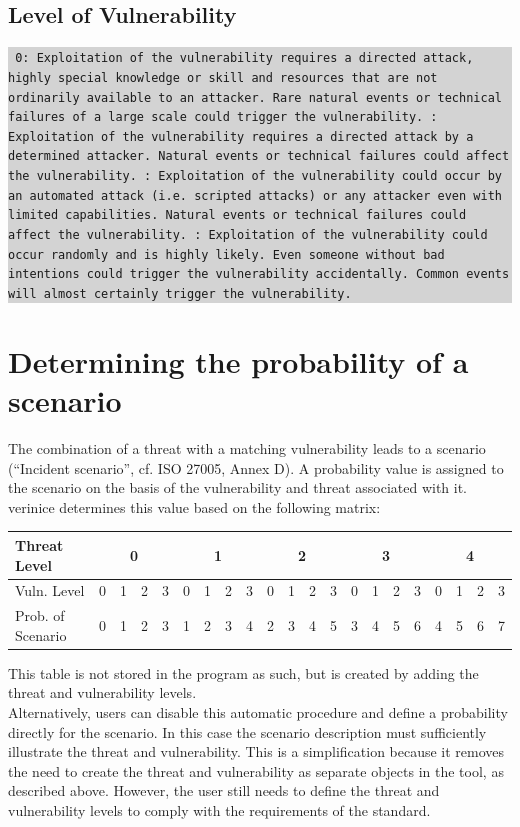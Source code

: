 \documentclass[a4paper,10pt]{book}
\begin{document}
\subsection{Level of Vulnerability}
\colorbox{lightgray}{\parbox{\textwidth}{
{\tt
0: Exploitation of the vulnerability requires a directed attack, highly special
knowledge or skill and resources that are not ordinarily available to an
attacker. Rare natural events or technical failures of a large scale could
trigger the vulnerability.
\newline{}: Exploitation of the vulnerability requires a directed
attack by a determined attacker. Natural events or
technical failures could affect the vulnerability.
\newline{}: Exploitation of the vulnerability could occur by an
automated attack (i.e. scripted attacks) or any attacker
even with limited capabilities. Natural events or technical
failures could affect the vulnerability.
\newline{}: Exploitation of the vulnerability could occur randomly
and is highly likely. Even someone without bad intentions
could trigger the vulnerability accidentally. Common events
will almost certainly trigger the vulnerability.}
}}

\section{Determining the probability of a scenario}
The combination of a threat with a matching vulnerability leads to a scenario
(``Incident scenario'', cf. ISO 27005, Annex D). A probability value is assigned to the
scenario on the basis of the vulnerability and threat associated with it. verinice determines
this value based on the following matrix:
\begin{longtable}{|l||c|c|c|c|c|c|c|c|c|c|c|c|c|c|c|c|c|c|c|c|}
\hline
Threat Level & \multicolumn{4}{c|}{0} & \multicolumn{4}{c|}{1} & \multicolumn{4}{c|}{2} & \multicolumn{4}{c|}{3} & \multicolumn{4}{c|}{4} \\[10pt]
\hline
Vuln. Level & 0 & 1 & 2 & 3 & 0 & 1 & 2 & 3 & 0 & 1 & 2 & 3 & 0 & 1 & 2 & 3 & 0 & 1 & 2 & 3  \\[9pt] \hline
Prob. of Scenario & 0 & 1 & 2 & 3 & 1 & 2 & 3 & 4 & 2 & 3 & 4 & 5 & 3 & 4 & 5 & 6 & 4 & 5 & 6 & 7  \\[9pt] \hline
\end{longtable}
This table is not stored in the program as such, but is created by adding the threat and vulnerability levels.
\newline\\
Alternatively, users can disable this automatic procedure and define a probability directly for the scenario.
In this case the scenario description must sufficiently illustrate the threat and vulnerability. This is a
simplification because it removes the need to create the threat and vulnerability as separate objects in the
tool, as described above. However, the user still needs to define the threat and vulnerability levels to
comply with the requirements of the standard.
\end{document}
